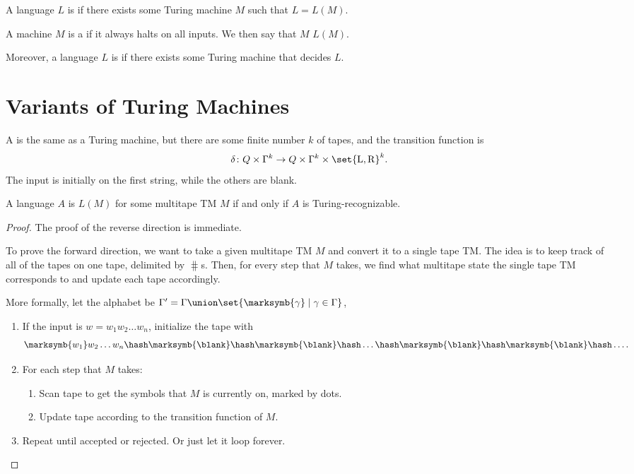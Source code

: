 \documentclass{standalone}
\begin{document}
\begin{definition}
	A language \(L\) is  if there exists
  some Turing machine \(M\) such that \(L = L(M)\).

	\tcblower
	A machine \(M\) is a  if it always halts on all inputs.
  We then say that \(M\)  \(L(M)\).

	Moreover, a language \(L\) is  if
  there exists some Turing machine that decides \(L\).
\end{definition}

\section{Variants of Turing Machines}
\begin{definition}
	A  is the same as a Turing machine,
  but there are some finite number \(k\) of tapes,
  and the transition function is
	\[
		\delta \colon Q \times \Gamma^k \to
                  Q \times \Gamma^k \times \set{\mathrm L, \mathrm R}^k.
	\]
	The input is initially on the first string, while the others are blank.
\end{definition}

\begin{proposition}
	A language \(A\) is \(L(M)\) for some multitape \textsf{TM} \(M\)
  if and only if \(A\) is Turing-recognizable.
\end{proposition}
\begin{proof}
	The proof of the reverse direction is immediate.
	
	To prove the forward direction, we want to take
  a given multitape \textsf{TM} \(M\) and
  convert it to a single tape \textsf{TM}.
  The idea is to keep track of all of the tapes on one tape,
  delimited by \(\hash\)s.
  Then, for every step that \(M\) takes,
  we find what multitape state the single tape \textsf{TM}
  corresponds to and update each tape accordingly.

	More formally, let the alphabet be
  \(\Gamma' = \Gamma \union \set{\marksymb{\gamma} \mid \gamma \in \Gamma}\),
	\begin{enumerate}[nosep]
		\item If the input is \(w = w_1 w_2 \ldots w_n\), initialize the tape with
		\[
			\marksymb{w_1} w_2 \ldots w_n
      \hash\marksymb{\blank}\hash\marksymb{\blank}\hash \ldots
      \hash\marksymb{\blank}\hash\marksymb{\blank}\hash \ldots.
		\]

		\item For each step that \(M\) takes:
		\begin{enumerate}[nosep]
			\item Scan tape to get the symbols that \(M\) is currently on,
      marked by dots.
			\item Update tape according to the transition function of \(M\).
		\end{enumerate}

		\item Repeat until accepted or rejected.
          Or just let it loop forever. \qedhere
	\end{enumerate}
\end{proof}
\end{document}
